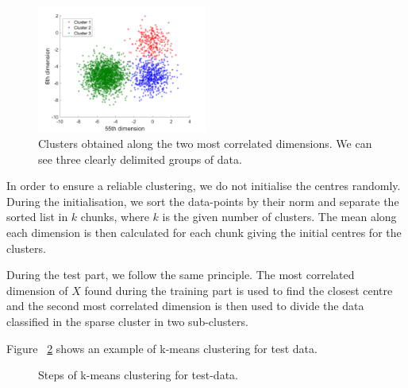 \documentclass{article} %
\begin{document}
\begin{figure}[!h] %
	\center
	\includegraphics[width=2.2in]{figures/clusters_train.png}
	\caption{Clusters obtained along the two most correlated dimensions. We can see three clearly delimited groups of data.}
	\label{fig:reg_clustersTrain}
\end{figure}

In order to ensure a reliable clustering, we do not initialise the centres randomly. During the initialisation, we sort the data-points by their norm and separate the sorted list in $k$ chunks, where $k$ is the given number of clusters. The mean along each dimension is then calculated for each chunk giving the initial centres for the clusters.

During the test part, we follow the same principle. The most correlated dimension of $X$ found during the training part is used to find the closest centre and the second most correlated dimension is then used to divide the data classified in the sparse cluster in two sub-clusters.

Figure ~\ref{fig:reg_clustersTest} shows an example of k-means clustering for test data.

\begin{figure}[!h] %
	\center
	\hfill
	\caption{Steps of k-means clustering for test-data.}
	\label{fig:reg_clustersTest}
\end{figure}
\end{document}
